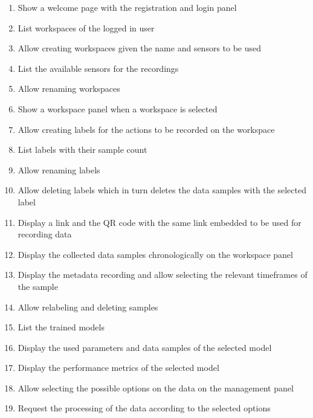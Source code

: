 \begin{enumerate}[{label = \textbf{/F{\protect\twodigits{\arabic{enumi}}}0/}, leftmargin = *}]
    \item \label{/F010/} Show a welcome page with the registration and login panel
    \item List workspaces of the logged in user
    \item Allow creating workspaces given the name and sensors to be used
    \item List the available sensors for the recordings
    \item Allow renaming workspaces
    \item Show a workspace panel when a workspace is selected
    \item Allow creating labels for the actions to be recorded on the workspace
    \item List labels with their sample count
    \item Allow renaming labels
    \item Allow deleting labels which in turn deletes the data samples with the selected label
    \item Display a link and the QR code with the same link embedded to be used for recording data
    \item Display the collected data samples chronologically on the workspace panel
    \item Display the metadata recording and allow selecting the relevant timeframes of the sample
    \item Allow relabeling and deleting samples
    \item List the trained models
    \item Display the used parameters and data samples of the selected model
    \item Display the performance metrics of the selected model
    \item Allow selecting the possible options on the data on the management panel %
    \item Request the processing of the data according to the selected options
\end{enumerate}

